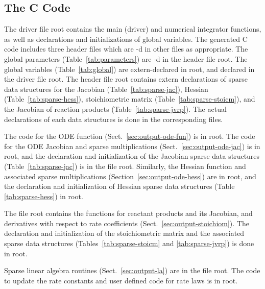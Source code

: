 \documentclass[twoside]{article}
\newcommand{\kpproot}{{\sc root}}
\begin{document}
\subsection{The C Code}
\label{sec:c}

The driver file \kpproot{} contains the main (driver) and
numerical integrator functions, as well as declarations and
initializations of global variables. The generated C code includes three
header files which are -d in other files as appropriate.
The global parameters (Table~\ref{tab:parameters}) are -d
in the header file \kpproot{}. The global variables
(Table~\ref{tab:global}) are extern-declared in
\kpproot{}, and declared in the driver file
\kpproot{}. The header file \kpproot{} contains
extern declarations of sparse data structures for the Jacobian
(Table~\ref{tab:sparse-jac}), Hessian (Table~\ref{tab:sparse-hess}),
stoichiometric matrix (Table~\ref{tab:sparse-stoicm}), and the Jacobian
of reaction products (Table~\ref{tab:sparse-jvrp}). The actual
declarations of each data structures is done in the corresponding files.

The code for the ODE function (Sect.~\ref{sec:output-ode-fun}) is in
\kpproot{}. The code for the ODE Jacobian and sparse
multiplications (Sect.~\ref{sec:output-ode-jac}) is in
\kpproot{}, and the declaration and initialization of
the Jacobian sparse data structures (Table~\ref{tab:sparse-jac}) is in
the file \kpproot{}. Similarly, the Hessian function
and associated sparse multiplications
(Section~\ref{sec:output-ode-hess}) are in \kpproot{},
and the declaration and initialization of Hessian sparse data structures
(Table \ref{tab:sparse-hess}) in \kpproot{}.

The file \kpproot{} contains the functions for reactant
products and its Jacobian, and derivatives with respect to rate
coefficients (Sect.~\ref{sec:output-stoichiom}). The declaration and
initialization of the stoichiometric matrix and the associated sparse
data structures (Tables~\ref{tab:sparse-stoicm} and
\ref{tab:sparse-jvrp}) is done in \kpproot{}.

Sparse linear algebra routines (Sect.~\ref{sec:output-la}) are in
the file \kpproot{}. The code to update the rate
constants and user defined code for rate laws is in
\kpproot{}.
\end{document}
